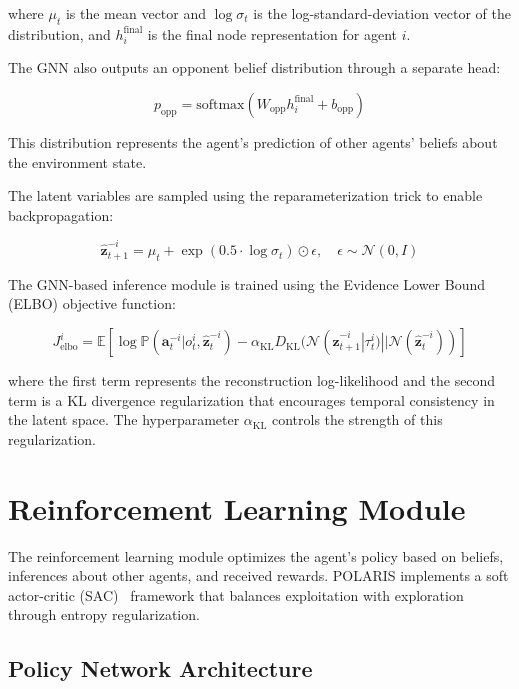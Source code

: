 where $\mu_{t}$ is the mean vector and $\log\sigma_{t}$ is the log-standard-deviation vector of the distribution, and $h^{\text{final}}_i$ is the final node representation for agent $i$.

The GNN also outputs an opponent belief distribution through a separate head:

\begin{equation}
    p_{\text{opp}} = \text{softmax}(W_{\text{opp}}h^{\text{final}}_i + b_{\text{opp}})
\end{equation}

This distribution represents the agent's prediction of other agents' beliefs about the environment state.

The latent variables are sampled using the reparameterization trick to enable backpropagation:

\begin{equation}
    \hat{\boldsymbol{z}}^{-i}_{t+1} = \mu_{t} + \exp(0.5 \cdot \log\sigma_{t}) \odot \epsilon, \quad \epsilon \sim \mathcal{N}(0, I)
\end{equation}

The GNN-based inference module is trained using the Evidence Lower Bound (ELBO) objective function:

\begin{equation}
    J^{i}_{\text{elbo}} = \mathbb{E}[\log \mathbb{P}(\boldsymbol{a}^{-i}_{t}|o^{i}_{t}, \hat{\boldsymbol{z}}^{-i}_{t}) - \alpha_{\text{KL}}D_{\text{KL}}(\mathcal{N}(\hat{\boldsymbol{z}}^{-i}_{t+1}|\tau^i_t) || \mathcal{N}(\hat{\boldsymbol{z}}^{-i}_{t}))]
\end{equation}

where the first term represents the reconstruction log-likelihood and the second term is a KL divergence regularization that encourages temporal consistency in the latent space. The hyperparameter $\alpha_{\text{KL}}$ controls the strength of this regularization.


\section{Reinforcement Learning Module}

The reinforcement learning module optimizes the agent's policy based on beliefs, inferences about other agents, and received rewards. POLARIS implements a soft actor-critic (SAC)~\cite{haarnoja2018soft} framework that balances exploitation with exploration through entropy regularization.

\subsection{Policy Network Architecture}

